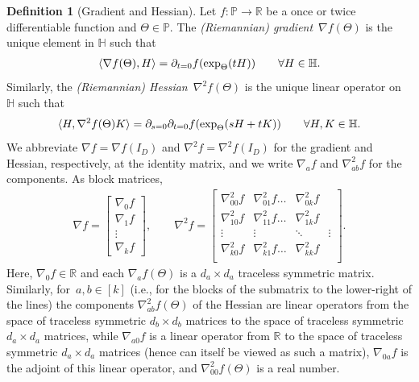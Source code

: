 \documentclass[aos]{imsart}
\theoremstyle{definition}
\newtheorem{definition}[theorem]{Definition}
\numberwithin{equation}{section}
\newcommand{\R}{{\mathbb{R}}}
\renewcommand{\P}{{\mathbb{P}}}
\renewcommand{\H}{{\mathbb{H}}}
\begin{document}
\begin{definition}[Gradient and Hessian]\label{def:hess grad}
Let $f\colon \P \to \R$ be a once or twice differentiable function and $\Theta \in \P$.
The \emph{(Riemannian) gradient}~$\nabla f(\Theta)$ is the unique element in $\H$ such that
\begin{align*}
  \braket{\nabla f(\Theta), H}
= \partial_{t=0} f(\exp_\Theta(tH))
\qquad \forall H \in \H.
\end{align*}
Similarly, the \emph{(Riemannian) Hessian}~$\nabla^2 f(\Theta)$ is the unique linear operator on~$\H$ such that
\begin{align*}
  \braket{H, \nabla^2 f(\Theta) K}
= \partial_{s=0} \partial_{t=0} f(\exp_{\Theta}(sH + tK))
\qquad \forall H,K \in \H.
\end{align*}
We abbreviate $\nabla f = \nabla f(I_D)$ and $\nabla^2 f = \nabla^2 f(I_D)$ for the gradient and Hessian, respectively, at the identity matrix, and we write $\nabla_a f$ and $\nabla^2_{ab}f$ for the components.
As block matrices,
\begin{align*}
  \nabla f = \left[\begin{array}{c} \nabla_0 f \\ \hline \nabla_1 f \\ \vdots \\ \nabla_k f \end{array}\right],
  \qquad
  \nabla^2 f = \left[\begin{array}{c|ccc}
  \nabla_{00}^2 f & \nabla_{01}^2 f \dots & \nabla_{0k}^2 f \\
    \hline\nabla_{10}^2 f & \nabla_{11}^2 f \dots & \nabla_{1k}^2 f \\
  \vdots  & \vdots & \ddots & \vdots \\
  \nabla_{k0}^2 f & \nabla_{k1}^2 f \dots & \nabla_{kk}^2 f \\
  \end{array}\right].
\end{align*}
Here, $\nabla_0 f \in \R$ and each $\nabla_a f(\Theta)$ is a $d_a \times d_a$ traceless symmetric matrix.
Similarly, for~$a, b \in [k]$ (i.e., for the blocks of the submatrix to the lower-right of the lines) the components $\nabla_{ab}^2f(\Theta)$ of the Hessian are linear operators from the space of traceless symmetric $d_b\times d_b$ matrices to the space of traceless symmetric $d_a \times d_a$ matrices, while $\nabla_{a0}f$ is a linear operator from $\R$ to the space of traceless symmetric $d_a\times d_a$ matrices (hence can itself be viewed as such a matrix), $\nabla_{0a}f$ is the adjoint of this linear operator, and $\nabla^2_{00} f(\Theta)$ is a real number.
\end{definition}
\end{document}
